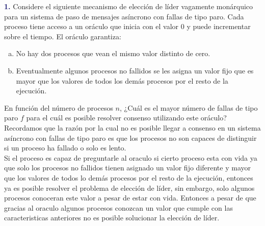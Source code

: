 \newpage\textbf{\textcolor{MidnightBlue}{1.}}
Considere el siguiente mecanismo de elección de líder vagamente monárquico para
un sistema de paso de mensajes asíncrono con fallas de tipo paro. Cada proceso tiene
acceso a un oráculo que inicia con el valor $0$ y puede incrementar sobre el tiempo.
El oráculo garantiza:
\begin{enumerate}[a)]
\item No hay dos procesos que vean el mismo valor distinto de cero.
\item Eventualmente algunos procesos no fallidos se les asigna un valor fijo que es
mayor que los valores de todos los demás procesos por el resto de la ejecución.
\end{enumerate}

En función del número de procesos $n$, ¿Cuál es el mayor número
de fallas de tipo paro $f$ para el cuál es posible resolver consenso utilizando este oráculo?\\

Recordamos que la razón por la cual no es posible llegar a consenso
en un sistema asíncrono con fallas de tipo paro es que los
procesos no son capaces de  distinguir si un proceso ha fallado o
solo es lento.\\

Si el proceso es capaz de preguntarle al oraculo si cierto proceso esta con
vida ya que solo los procesos no fallidos tienen asignado un valor fijo
diferente y mayor que los valores de todos lo demás procesos por el resto de la
ejecución, entonces ya es posible resolver el problema de elección de líder,
sin embargo, solo algunos procesos conoceran este valor a pesar de estar con
vida. Entonces a pesar de que gracias al oraculo algunos procesos conozcan un
valor que cumple con las caracteristicas anteriores no es posible
solucionar la elección de líder.\\
